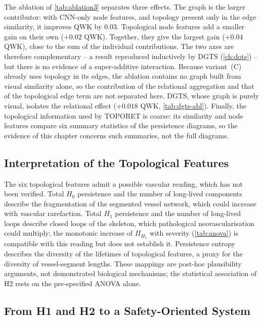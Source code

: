 The ablation of \cref{tab:ablation3} separates three effects. The graph is the larger
contributor: with CNN-only node features, and topology present only in the edge
similarity, it improves QWK by $0.03$. Topological node features add a smaller gain on
their own ($+0.02$ QWK). Together, they give the largest gain ($+0.04$ QWK), close to the sum
of the individual contributions. The two axes are therefore complementary -- a result
reproduced inductively by DGTS (\cref{ch:dots}) -- but there is no evidence of a
super-additive interaction. Because variant~(C) already uses topology in its edges, the
ablation contains no graph built from visual similarity alone, so the contribution of the
relational aggregation and that of the topological edge term are not separated here. DGTS,
whose graph is purely visual, isolates the relational effect ($+0.018$ QWK,
\cref{tab:dgts-abl}). Finally, the topological information used by TOPORET is coarse: its
similarity and node features compare six summary statistics of the persistence diagrams,
so the evidence of this chapter concerns such summaries, not the full diagrams.

\subsection{Interpretation of the Topological Features}
\label{sec:tda-bio}

The six topological features admit a possible vascular reading, which has not been
verified. Total $H_0$ persistence and the number of long-lived components describe the
fragmentation of the segmented vessel network, which could increase with vascular
rarefaction. Total $H_1$ persistence and the number of long-lived loops describe closed
loops of the skeleton, which pathological neovascularisation could multiply; the monotonic increase of $\Pi_{H_1}$ with severity (\cref{tab:anova}) is
compatible with this reading but does not establish it. Persistence entropy describes the diversity of the lifetimes
of topological features, a proxy for the diversity of vessel-segment lengths. These
mappings are post-hoc plausibility arguments, not demonstrated biological mechanisms; the
statistical association of H2 rests on the pre-specified ANOVA alone.

\subsection{From H1 and H2 to a Safety-Oriented System}
\label{sec:ch3-deploy}

